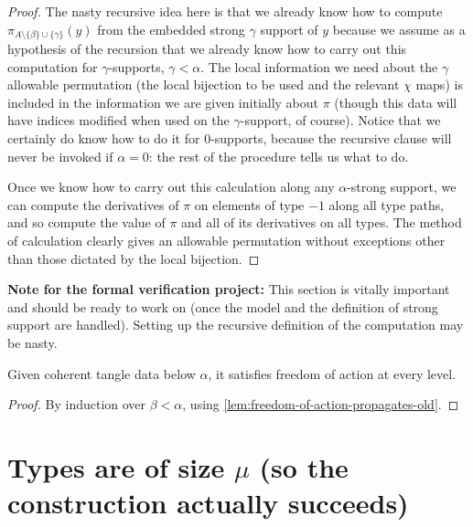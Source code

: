 \begin{proof}
The nasty recursive idea here is that we already know how to compute $\pi_{A \setminus \{\beta\} \cup \{\gamma\}}(y)$ from the embedded strong $\gamma$ support of $y$ because we assume as a hypothesis of the recursion that we already know how to carry out this computation for $\gamma$-supports, $\gamma<\alpha$.  The  local information we need about the $\gamma$ allowable permutation (the local bijection to be used and the relevant $\chi$ maps) is included in the information we are given initially about $\pi$ (though this data will have indices modified when used on the $\gamma$-support, of course).  Notice that we certainly do know how to do it for 0-supports, because the recursive clause will never be invoked if $\alpha=0$:  the rest of the procedure tells us what to do.

Once we know how to carry out this calculation along any $\alpha$-strong support, we can compute the derivatives of $\pi$ on elements of type $-1$  along all type paths, and so compute the value of $\pi$ and all of its derivatives on all types.  The method of calculation clearly gives an allowable permutation without exceptions other than those dictated by the local bijection.
\end{proof}

{\bf Note for the formal verification project:}  This section is vitally important and should be ready to work on (once the model and the definition of strong support are handled).  Setting up the recursive definition of the computation may be nasty.

\begin{theorem}
  \label{thm:freedom-of-action-old}
  Given coherent tangle data below $\alpha$, it satisfies freedom of action at every level.
\end{theorem}

\begin{proof}
  By induction over $\beta < \alpha$, using \cref{lem:freedom-of-action-propagates-old}.
\end{proof}


\newpage
\section{Types are of size \texorpdfstring{$\mu$}{μ} (so the construction actually succeeds)}


